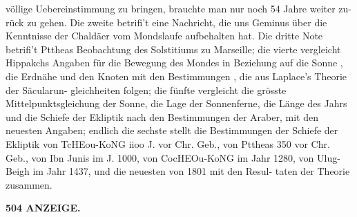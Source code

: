 \documentclass[12pt,a4paper]{article}
\begin{document}
völlige  Uebereinstimmung  zu  bringen,  brauchte  man  nur  noch  54  Jahre  weiter  zu- rück zu  gehen.  Die  zweite  betrifi't  eine  Nachricht,  die  uns  Geminus  über  die  Kenntnisse  der  Chaldäer vom  Mondslaufe  aufbehalten  hat.  Die  dritte  Note  betrifi't  Pttheas  Beobachtung  des  Solstitiums  zu Marseille;  die  vierte  vergleicht  Hippakchs  Angaben  für  die  Bewegung  des  Mondes  in  Beziehung  auf  die Sonne ,  die  Erdnähe  und  den  Knoten  mit  den  Bestimmungen ,  die  aus  Laplace's  Theorie  der  Säcularun- gleichheiten folgen;  die  fünfte  vergleicht  die  grösste  Mittelpunktsgleichung  der  Sonne,  die  Lage  der Sonnenferne,  die  Länge  des  Jahrs  und  die  Schiefe  der  Ekliptik  nach  den  Bestimmungen  der  Araber, mit  den  neuesten  Angaben;  endlich  die  sechste  stellt  die  Bestimmungen  der  Schiefe  der  Ekliptik  von TcHEou-KoNG  iioo  J.  vor  Chr.  Geb.,  von  Pttheas  350  vor  Chr.  Geb.,  von  Ibn  Junis  im  J.  1000,  von CocHEOu-KoNG  im  Jahr  1280,  von  Ulug-Beigh  im  Jahr  1437,  und  die  neuesten  von  1801  mit  den  Resul- taten der  Theorie  zusammen.

\vspace{0.5em}


\noindent\textbf{504  ANZEIGE.}
\end{document}
